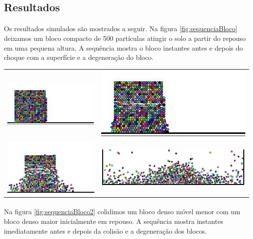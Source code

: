 \documentclass[a0,portrait]{a0poster}
\begin{document}
\begin{multicols}{2}
\section*{Resultados}
\paragraph{}Os resultados simulados são mostrados a seguir.
Na figura \ref{fig:sequenciaBloco} deixamos um bloco compacto de 500 partículas
atingir o solo a partir do repouso em uma pequena altura. A sequência mostra o
bloco instantes antes e depois do choque com a superfície e a degeneração do
bloco.

\FloatBarrier
\vspace{-2cm}
\begin{center}\vspace{3cm}
\begin{tabular}{ll}
\includegraphics[width=0.3\linewidth]{../images/seq01.jpg} &
\includegraphics[width=0.3\linewidth]{../images/seq02.jpg} \\
\includegraphics[width=0.3\linewidth]{../images/seq03.jpg} &
\includegraphics[width=0.4\linewidth]{../images/seq04.jpg} \\
\end{tabular}
\label{fig:sequenciaBloco}
\end{center}
\FloatBarrier

\paragraph{}Na figura \ref{fig:sequenciaBloco2} colidimos um bloco denso móvel
menor com um bloco denso maior inicialmente em repouso. A sequência mostra
instantes imediatamente antes e depois da colisão e a degeneração dos blocos.


\end{multicols}
\end{document}
